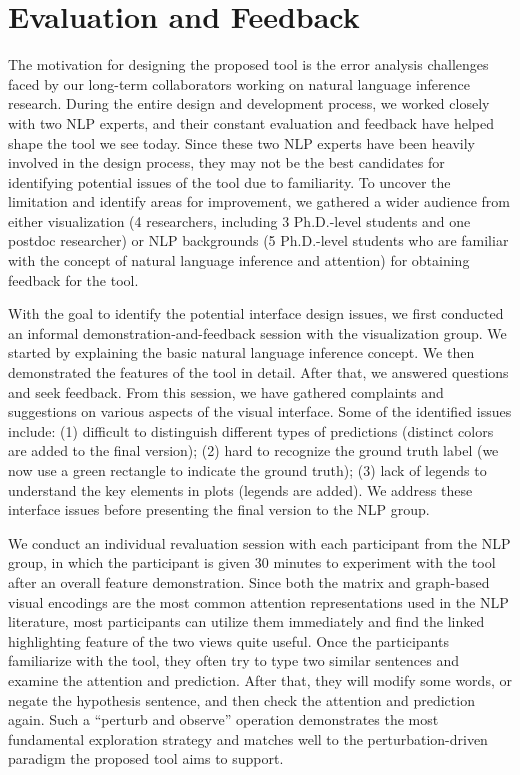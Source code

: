 \section{Evaluation and Feedback}
The motivation for designing the proposed tool is the error analysis challenges faced by our long-term collaborators working on natural language inference research. During the entire design and development process, we worked closely with two NLP experts, and their constant evaluation and feedback have helped shape the tool we see today. 
%
Since these two NLP experts have been heavily involved in the design process, they may not be the best candidates for identifying potential issues of the tool due to familiarity.  To uncover the limitation and identify areas for improvement, we gathered a wider audience from either visualization (4 researchers, including 3 Ph.D.-level students and one postdoc researcher) or NLP backgrounds (5 Ph.D.-level students who are familiar with the concept of natural language inference and attention) for obtaining feedback for the tool.  

With the goal to identify the potential interface design issues, we first conducted an informal demonstration-and-feedback session with the visualization group. We started by explaining the basic natural language inference concept. We then demonstrated the features of the tool in detail. After that, we answered questions and seek feedback.
%
From this session, we have gathered complaints and suggestions on various aspects of the visual interface. Some of the identified issues include: (1) difficult to distinguish different types of predictions (distinct colors are added to the final version); (2) hard to recognize the ground truth label (we now use a green rectangle to indicate the ground truth); (3) lack of legends to understand the key elements in plots (legends are added). We address these interface issues before presenting the final version to the NLP group.

We conduct an individual revaluation session with each participant from the NLP group, in which the participant is given 30 minutes to experiment with the tool after an overall feature demonstration. 
%
Since both the matrix and graph-based visual encodings are the most common attention representations used in the NLP literature, most participants can utilize them immediately and find the linked highlighting feature of the two views quite useful.
% 
Once the participants familiarize with the tool, they often try to type two similar sentences and examine the attention and prediction. After that, they will modify some words, or negate the hypothesis sentence, and then check the attention and prediction again.
%
Such a ``perturb and observe'' operation demonstrates the most fundamental exploration strategy and matches well to the perturbation-driven paradigm the proposed tool aims to support.

